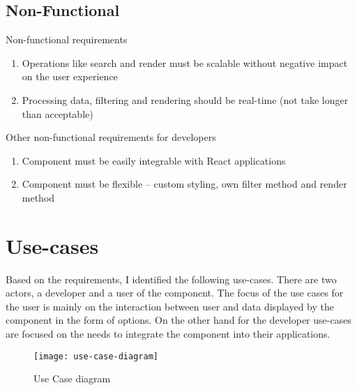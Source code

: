 
\subsection{Non-Functional}

Non-functional requirements
\begin{enumerate}
    \item Operations like search and render must be scalable without negative impact on the user experience
    \item Processing data, filtering and rendering should be real-time (not take longer than acceptable)
\end{enumerate}
Other non-functional requirements for developers
\begin{enumerate}[resume]
    \item Component must be easily integrable with React applications
    \item Component must be flexible – custom styling, own filter method and render method
\end{enumerate}


\section{Use-cases}
 
Based on the requirements, I identified the following use-cases. There are two actors, a developer and a user of the component. The focus of the use cases for the user is mainly on the interaction between user and data displayed by the component in the form of options. On the other hand for the developer use-cases are focused on the needs to integrate the component into their applications.
 
 \begin{figure}[th]
    \centering
    \texttt{[image: use-case-diagram]}
    \decoRule
    \caption[Use Case diagram]{Use Case diagram}
    \label{fig:use-case-diagram}
 \end{figure}


